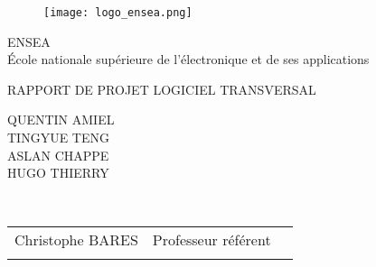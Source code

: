 \begin{titlepage}
\centering
\vspace*{-2cm}


\begin{figure}[htbp]
\centering
\texttt{[image: logo\_ensea.png]}

\end{figure}
\begin{center}
	\vspace{0.4cm}
	\LARGE ENSEA\\
	\vspace{0.2cm}
	\Large École nationale supérieure de l'électronique et de ses applications\\
	\vspace{0.2cm}
	
    \begin{center}
		\vspace{1cm}
		RAPPORT DE PROJET LOGICIEL TRANSVERSAL\\
    \end{center}
	\vspace{0.4cm}
    
    \begin{center}
        \vspace{0.4cm}
        \Large QUENTIN AMIEL\\
        \Large TINGYUE TENG\\
        \Large ASLAN CHAPPE\\
        \Large HUGO THIERRY\\
        \vspace{1cm}
			
        \vspace{0.8cm}
        \large 
    \end{center}
	\vspace{1cm}
    \large \\
\end{center}

\vspace{0.2cm} \normalsize
\begin{center}
\begin{tabular}{lll}
	Christophe BARES & Professeur référent \\
    \vspace{0.1cm}
	
\end{tabular}
\end{center}
\end{titlepage}
